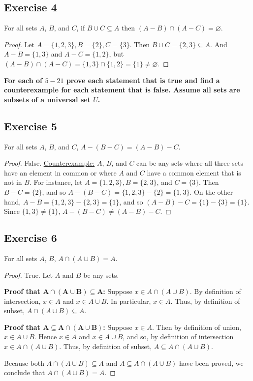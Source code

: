 \documentclass[14pt]{extarticle}
\newcommand{\es}{\varnothing}
\newcommand{\cy}{\color{cyan}}
\begin{document}
\subsection{Exercise 4}
For all sets $A$, $B$, and $C$, if \(B \cup C \subseteq A\) then \((A - B) \cap (A - C) = \es\).

\begin{proof}
Let \(A = \{1, 2, 3\}, B = \{2\}, C = \{3\}\). Then \(B \cup C = \{2, 3\} \subseteq A\). And \(A - B = \{1, 3\}\)
and \(A - C = \{1, 2\}\), but \((A - B) \cap (A - C) = \{1, 3\} \cap \{1, 2\} = \{1\} \neq \es\).
\end{proof}

{\bf \cy For each of $5-21$ prove each statement that is true and find a counterexample for each statement that is false. Assume all sets are subsets of a universal set $U$.}

\subsection{Exercise 5}
For all sets $A$, $B$, and $C$, \(A - (B - C) = (A - B) - C\).

\begin{proof}
False. \underline{Counterexample:} $A$, $B$, and $C$ can be any sets where all three sets have an element in common or 
where $A$ and $C$ have a common element that is not in $B$. For instance, let \(A = \{1, 2, 3\}, B = \{2, 3\}\), and 
\(C = \{3\}\). Then \(B - C = \{2\}\), and so \(A - (B - C) = \{1, 2, 3\} - \{2\} = \{1, 3\}\). On the other hand, 
\(A - B = \{1, 2, 3\} - \{2, 3\} = \{1\}\), and so \((A - B) - C = \{1\} - \{3\} = \{1\}\). 
Since \(\{1, 3\} \neq \{1\}\), \(A-(B-C) \neq (A-B)-C\).
\end{proof}

\subsection{Exercise 6}
For all sets $A$, $B$, \(A \cap (A \cup B) = A\).

\begin{proof}
True. Let $A$ and $B$ be any sets. 

{\bf Proof that \(\bm{A \cap (A \cup B) \subseteq A}\):} Suppose \(x \in A \cap (A \cup B)\). By definition of 
intersection, $x \in A$ and \(x \in A \cup B\). In particular, $x \in A$. Thus, by definition of subset, 
\(A \cap (A \cup B) \subseteq A\). 

{\bf Proof that \(\bm{A \subseteq A \cap (A \cup B)}\):} Suppose $x \in A$. Then by definition of union, \(x \in A \cup B\). 
Hence $x \in A$ and \(x \in A \cup B\), and so, by definition of intersection \(x \in A \cap (A \cup B)\). 
Thus, by definition of subset, \(A \subseteq A \cap (A \cup B)\). 

Because both \(A \cap (A \cup B) \subseteq A\) and \(A \subseteq A \cap (A \cup B)\) have been proved, we conclude 
that \(A \cap (A \cup B) = A\).
\end{proof}
\end{document}
